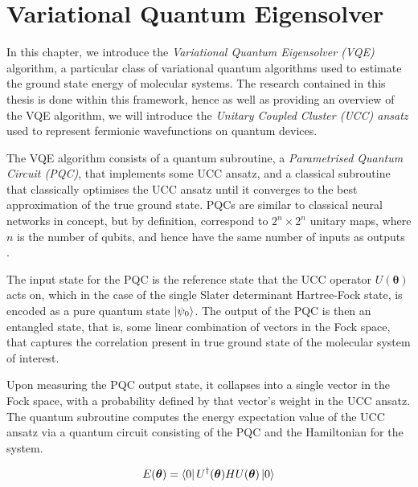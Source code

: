 \section{\label{vqe}Variational Quantum Eigensolver}

In this chapter, we introduce the \textit{Variational Quantum Eigensolver (VQE)} algorithm, a particular class of variational quantum algorithms used to estimate the ground state energy of molecular systems. The research contained in this thesis is done within this framework, hence as well as providing an overview of the VQE algorithm, we will introduce the \textit{Unitary Coupled Cluster (UCC) ansatz} used to represent fermionic wavefunctions on quantum devices.

The VQE algorithm consists of a quantum subroutine, a \textit{Parametrised Quantum Circuit (PQC)}, that implements some UCC ansatz, and a classical subroutine that classically optimises the UCC ansatz until it converges to the best approximation of the true ground state. PQCs are similar to classical neural networks in concept, but by definition, correspond to $2^n \times 2^n$ unitary maps, where $n$ is the number of qubits, and hence have the same number of inputs as outputs \cite{Yeung2020}.

The input state for the PQC is the reference state that the UCC operator $U(\bm\theta)$ acts on, which in the case of the single Slater determinant Hartree-Fock state, is encoded as a pure quantum state $\ket{\psi_0}$. The output of the PQC is then an entangled state, that is, some linear combination of vectors in the Fock space, that captures the correlation present in true ground state of the molecular system of interest.

Upon measuring the PQC output state, it collapses into a single vector in the Fock space, with a probability defined by that vector's weight in the UCC ansatz. The quantum subroutine computes the energy expectation value of the UCC ansatz via a quantum circuit consisting of the PQC and the Hamiltonian for the system.

\begin{equation*}
    E(\bm\theta) = \bra{0} U^\dagger(\bm\theta) H U(\bm\theta) \ket{0} 
\end{equation*}

